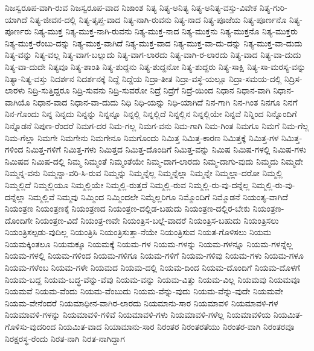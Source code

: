 {ನಿಜಸ್ವರೂಪ-ವಾಗಿ-ರುವ
ನಿಜಸ್ವರೂಪ-ವಾದ
ನಿಜಾಂಶ
ನಿತ್ಯ
ನಿತ್ಯ-ಅನಿತ್ಯ
ನಿತ್ಯ-ಅನಿತ್ಯ-ವಸ್ತು-ವಿವೇಕ
ನಿತ್ಯ-ಗುರಿ-ಯಾಗಿದೆ
ನಿತ್ಯ-ಜೀವನ-ದಲ್ಲಿ
ನಿತ್ಯ-ತೃಪ್ತ-ವಾದ
ನಿತ್ಯ-ನಾಗಿ-ರುವನು
ನಿತ್ಯ-ನಾದ
ನಿತ್ಯ-ಪೂಜೆಯ
ನಿತ್ಯ-ಪೂರ್ಣನೊ
ನಿತ್ಯ-ಪೂರ್ಣರು
ನಿತ್ಯ-ಮುಕ್ತ
ನಿತ್ಯ-ಮುಕ್ತ-ನಾಗಿ-ರುವನು
ನಿತ್ಯ-ಮುಕ್ತ-ನಾದ
ನಿತ್ಯ-ಮುಕ್ತನು
ನಿತ್ಯ-ಮುಕ್ತನೊ
ನಿತ್ಯ-ಮುಕ್ತರು
ನಿತ್ಯ-ಮುಕ್ತ-ರೆಂಬು-ದನ್ನು
ನಿತ್ಯ-ಮುಕ್ತ-ವಾಗಿದೆ
ನಿತ್ಯ-ಮುಕ್ತ-ವಾದ
ನಿತ್ಯ-ಮುಕ್ತ-ವಾ-ದು-ದನ್ನು
ನಿತ್ಯ-ಮುಕ್ತ-ವಾ-ದುದು
ನಿತ್ಯ-ವನ್ನು
ನಿತ್ಯ-ವಲ್ಲ
ನಿತ್ಯ-ವಾಗ-ಬಲ್ಲುದು
ನಿತ್ಯ-ವಾಗ-ಲಾರದು
ನಿತ್ಯ-ವಾಗಿ-ರ-ಲಾರದು
ನಿತ್ಯ-ವಾದ
ನಿತ್ಯ-ವಾ-ದುದು
ನಿತ್ಯ-ವಾ-ದುದೇ
ನಿತ್ಯವೂ
ನಿತ್ಯ-ಶಾಂತಿ
ನಿತ್ಯ-ಶುದ್ದನು
ನಿತ್ಯ-ಶುದ್ದನೋ
ನಿತ್ಯ-ಶುದ್ದರು
ನಿತ್ಯ-ಸಾಕ್ಷಿ
ನಿತ್ಯ-ಸಾ-ಮರಸ್ಯ-ವನ್ನು
ನಿತ್ಯಾ-ನಿತ್ಯ-ವಸ್ತು
ನಿದರ್ಶನ
ನಿದರ್ಶನಕ್ಕೆ
ನಿದ್ದೆ
ನಿದ್ದೆಯ
ನಿದ್ರಾ-ತೀತ
ನಿದ್ರಾ-ವಸ್ಥೆ-ಯಲ್ಲೂ
ನಿದ್ರಾ-ಸಮಯ-ದಲ್ಲಿ
ನಿದ್ರಿಸ-ಲಾರಳು
ನಿದ್ರಿ-ಸುತ್ತಿದ್ದರೂ
ನಿದ್ರಿ-ಸುವನು
ನಿದ್ರಿ-ಸುವರೋ
ನಿದ್ರೆ
ನಿದ್ರೆಗೆ
ನಿದ್ರೆ-ಯಿಂದ
ನಿಧಾನ
ನಿಧಾನ-ವಾಗಿ
ನಿಧಾನ-ವಾಗಿಯೊ
ನಿಧಾನ-ವಾದ
ನಿಧಾನ-ವಾ-ದುದು
ನಿಧಿ
ನಿಧಿ-ಯನ್ನು
ನಿಧಿ-ಯಾಗಿದೆ
ನಿನ-ಗಾಗಿ
ನಿನ-ಗಿಂತ
ನಿನಗೂ
ನಿನಗೆ
ನಿನ-ಗೊಂದು
ನಿನ್ನ
ನಿನ್ನದು
ನಿನ್ನನ್ನು
ನಿನ್ನನ್ನೂ
ನಿನ್ನಲ್ಲಿ
ನಿನ್ನಲ್ಲಿದೆ
ನಿನ್ನಲ್ಲಿನ
ನಿನ್ನಲ್ಲಿಯೇ
ನಿನ್ನವೆ
ನಿನ್ನಿಂದ
ನಿನ್ನೊಂದಿಗೆ
ನಿನ್ನೊಡನೆ
ನಿಪುಣ-ರೆಂದರೆ
ನಿಮಗ-ದರ
ನಿಮ-ಗಲ್ಲ
ನಿಮಗ-ವನು
ನಿಮ-ಗಾಗಿ
ನಿಮ-ಗಿಂತ
ನಿಮಗೂ
ನಿಮಗೆ
ನಿಮ-ಗೆಲ್ಲ
ನಿಮ-ಗೆಲ್ಲಾ
ನಿಮಗೇ
ನಿಮಗೇನು
ನಿಮಗೇನೂ
ನಿಮಗೊಂದು
ನಿಮಿತ್ತ
ನಿಮಿತ್ತ-ಕಾರಣ
ನಿಮಿತ್ತಕ್ಕೆ
ನಿಮಿತ್ತ-ಗಳ
ನಿಮಿತ್ತ-ಗಳಿಂದ
ನಿಮಿತ್ತ-ಗಳಿಗೆ
ನಿಮಿತ್ತ-ಗಳು
ನಿಮಿತ್ತದ
ನಿಮಿತ್ತ-ದೊಂದಿಗೆ
ನಿಮಿತ್ತ-ವನ್ನು
ನಿಮಿಷ
ನಿಮಿಷ-ಗಳಲ್ಲಿ
ನಿಮಿಷ-ಗಳು
ನಿಮಿಷದ
ನಿಮಿಷ-ದಲ್ಲಿ
ನಿಮ್ಮ
ನಿಮ್ಮಂತೆ
ನಿಮ್ಮಂತೆಯೇ
ನಿಮ್ಮ-ದಾಗ-ಲಾರದು
ನಿಮ್ಮ-ದಾಗು-ವುದು
ನಿಮ್ಮದು
ನಿಮ್ಮದೇ
ನಿಮ್ಮನ್ನ-ವನು
ನಿಮ್ಮನ್ನಾ-ವರಿ-ಸಿ-ರುವ
ನಿಮ್ಮನ್ನು
ನಿಮ್ಮನ್ನೆಲ್ಲ
ನಿಮ್ಮನ್ನೆಲ್ಲಾ
ನಿಮ್ಮನ್ನೇ
ನಿಮ್ಮಲ್ಲಾ-ದರೋ
ನಿಮ್ಮಲ್ಲಿ
ನಿಮ್ಮಲ್ಲಿದೆ
ನಿಮ್ಮಲ್ಲಿಯೂ
ನಿಮ್ಮಲ್ಲಿಯೇ
ನಿಮ್ಮಲ್ಲಿ-ರುತ್ತದೆ
ನಿಮ್ಮಲ್ಲಿ-ರುವ
ನಿಮ್ಮಲ್ಲಿ-ರು-ವು-ದನ್ನೆಲ್ಲ
ನಿಮ್ಮಲ್ಲಿ-ರು-ವು-ದನ್ನೆಲ್ಲಾ
ನಿಮ್ಮಲ್ಲಿವೆ
ನಿಮ್ಮವು
ನಿಮ್ಮಿಂದ
ನಿಮ್ಮಿಂದಲೇ
ನಿಮ್ಮೆಲ್ಲರಿಗೂ
ನಿಮ್ಮೊಂದಿಗೆ
ನಿಮ್ಮೊಡನೆ
ನಿಯಂತೃ-ವಾಗಿದೆ
ನಿಯಂತ್ರಣ
ನಿಯಂತ್ರಣಕ್ಕೆ
ನಿಯಂತ್ರಣದ
ನಿಯಂತ್ರಣ-ದಲ್ಲಿಡ-ಬಹುದು
ನಿಯಂತ್ರಣ-ದಲ್ಲಿರ-ಬೇಕು
ನಿಯಂತ್ರಣ-ದೊಂದಿಗೇ
ನಿಯಂತ್ರಣ-ವಿದೆ
ನಿಯಂತ್ರ-ಣವೇ
ನಿಯಂತ್ರಿಸ-ಬಲ್ಲೆ-ವಾದರೆ
ನಿಯಂತ್ರಿಸ-ಬಹುದು
ನಿಯಂತ್ರಿಸಲು
ನಿಯಂತ್ರಿಸಲ್ಪಡು-ವುದಿಲ್ಲ
ನಿಯಂತ್ರಿಸಿ
ನಿಯಂತ್ರಿಸುತ್ತಾ-ನೆಯೇ
ನಿಯಂತ್ರಿಸುವ
ನಿಯತ-ಗೊಳಿಸಲು
ನಿಯಮ
ನಿಯಮಕ್ಕಿಂತಲೂ
ನಿಯಮಕ್ಕೂ
ನಿಯಮಕ್ಕೆ
ನಿಯಮ-ಗಳ
ನಿಯಮ-ಗಳನ್ನು
ನಿಯಮ-ಗಳನ್ನೂ
ನಿಯಮ-ಗಳನ್ನೆಲ್ಲ
ನಿಯಮ-ಗಳಲ್ಲಿ
ನಿಯಮ-ಗಳಿಂದ
ನಿಯಮ-ಗಳಿಗೂ
ನಿಯಮ-ಗಳಿಗೆ
ನಿಯಮ-ಗಳಿವು
ನಿಯಮ-ಗಳು
ನಿಯಮ-ಗಳೂ
ನಿಯಮ-ಗಳೆಂಬ
ನಿಯಮ-ಗಳೇ
ನಿಯಮದ
ನಿಯಮ-ದಲ್ಲಿ
ನಿಯಮ-ದಿಂದ
ನಿಯಮ-ದೊಂದಿಗೆ
ನಿಯಮ-ದೊಳಗೆ
ನಿಯಮ-ಬದ್ದ
ನಿಯಮ-ಬದ್ಧ-ವೆನ್ನು-ವೆವು
ನಿಯಮ-ವನ್ನು
ನಿಯಮ-ವಿತ್ತು
ನಿಯಮ-ವಿಲ್ಲ
ನಿಯಮವು
ನಿಯಮವೂ
ನಿಯಮವೆ
ನಿಯಮ-ವೆಂದು
ನಿಯಮ-ವೆಂಬುದು
ನಿಯಮ-ವೆನ್ನು-ವುದು
ನಿಯಮ-ವೆನ್ನು-ವುದೇ
ನಿಯಮವೇ
ನಿಯಮ-ವೇನೆಂದರೆ
ನಿಯಮಾಧೀನ-ವಾಗಿರ-ಲಾರದು
ನಿಯಮಾನು-ಸಾರ
ನಿಯಮಾವಳಿ
ನಿಯಮಾವಳಿ-ಗಳ
ನಿಯಮಾವಳಿ-ಗಳನ್ನು
ನಿಯಮಾವಳಿ-ಗಳಿವೆ
ನಿಯಮಾವಳಿ-ಗಳು
ನಿಯಮಾವಳಿ-ಗಳೆಲ್ಲ
ನಿಯಮಾವಳಿಯ
ನಿಯಮಿತ-ಗೊಳಿಸು-ವುದರಿಂದ
ನಿಯಮಿತ-ವಾದ
ನಿಯಾಮಾನು-ಸಾರ
ನಿರಂತರ
ನಿರಂತರತೆಯು
ನಿರಂತರ-ವಾಗಿ
ನಿರಂತರವೂ
ನಿರಕ್ಷರಸ್ಥ-ರೆಂದು
ನಿರತ-ನಾಗಿ
ನಿರತ-ನಾಗಿದ್ದಾಗ
}
